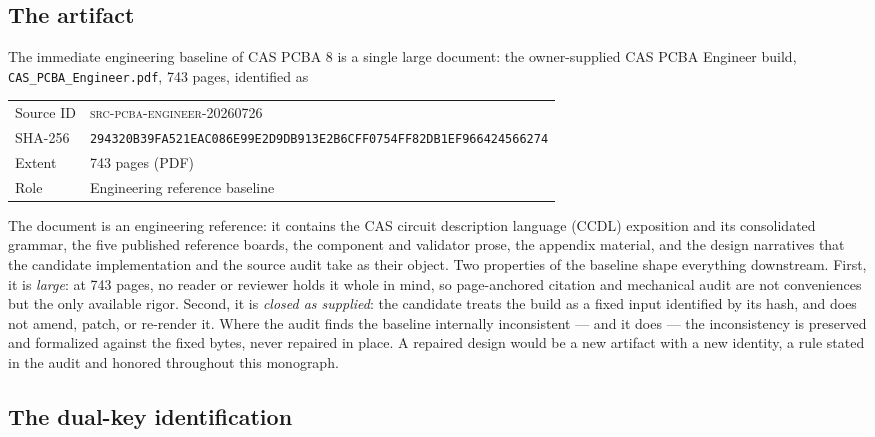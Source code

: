\subsection{The artifact}\label{ch03:baseline:artifact}

The immediate engineering baseline of CAS PCBA 8 is a single large
document: the owner-supplied CAS PCBA Engineer build,
\texttt{CAS\_PCBA\_Engineer.pdf}, 743 pages, identified as

\begin{center}
\begin{tabular}{@{}ll@{}}
\toprule
Source ID & \textsc{src-pcba-engineer-20260726} \\
SHA-256 & \texttt{294320B39FA521EAC086E99E2D9DB913E2B6CFF0754FF82DB1EF966424566274} \\
Extent & 743 pages (PDF) \\
Role & Engineering reference baseline \\
\bottomrule
\end{tabular}
\end{center}

The document is an engineering reference: it contains the CAS circuit
description language (CCDL) exposition and its consolidated grammar, the
five published reference boards, the component and validator prose, the
appendix material, and the design narratives that the candidate
implementation and the source audit take as their object. Two properties
of the baseline shape everything downstream. First, it is \emph{large}:
at 743 pages, no reader or reviewer holds it whole in mind, so
page-anchored citation and mechanical audit are not conveniences but the
only available rigor. Second, it is \emph{closed as supplied}: the
candidate treats the build as a fixed input identified by its hash, and
does not amend, patch, or re-render it. Where the audit finds the
baseline internally inconsistent --- and it does --- the inconsistency
is preserved and formalized against the fixed bytes, never repaired in
place. A repaired design would be a new artifact with a new identity, a
rule stated in the audit and honored throughout this monograph.

\subsection{The dual-key identification}\label{ch03:baseline:dualkey}

